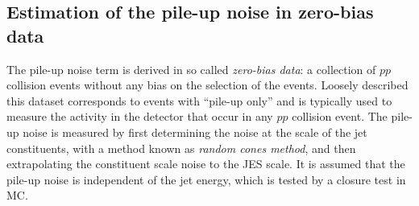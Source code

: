 




\subsection{Estimation of the pile-up noise in zero-bias data}
The pile-up noise term is derived in so called \emph{zero-bias data}: a collection of $pp$ collision events without any bias on the selection of the events. Loosely described this dataset corresponds to events with ``pile-up only'' and is typically used to measure the activity in the detector that occur in any $pp$ collision event. 
The pile-up noise is measured by first determining the noise at the scale of the jet constituents, with a method known as \emph{random cones method}, and then extrapolating the constituent scale noise to the JES scale. It is assumed that the pile-up noise is independent of the jet energy, which is tested by a closure test in MC. 

